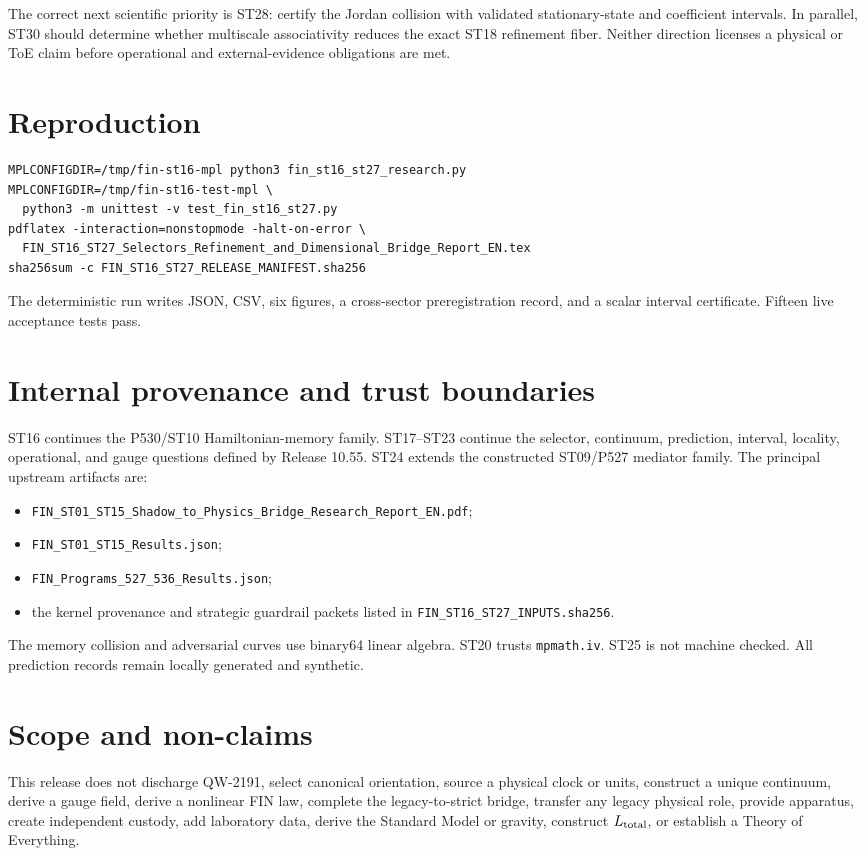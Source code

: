 \documentclass[11pt,a4paper]{article}
\begin{document}
The correct next scientific priority is ST28: certify the Jordan collision with validated stationary-state and coefficient intervals. In parallel, ST30 should determine whether multiscale associativity reduces the exact ST18 refinement fiber. Neither direction licenses a physical or ToE claim before operational and external-evidence obligations are met.

\appendix
\section{Reproduction}

\begin{verbatim}
MPLCONFIGDIR=/tmp/fin-st16-mpl python3 fin_st16_st27_research.py
MPLCONFIGDIR=/tmp/fin-st16-test-mpl \
  python3 -m unittest -v test_fin_st16_st27.py
pdflatex -interaction=nonstopmode -halt-on-error \
  FIN_ST16_ST27_Selectors_Refinement_and_Dimensional_Bridge_Report_EN.tex
sha256sum -c FIN_ST16_ST27_RELEASE_MANIFEST.sha256
\end{verbatim}

The deterministic run writes JSON, CSV, six figures, a cross-sector preregistration record, and a scalar interval certificate. Fifteen live acceptance tests pass.

\section{Internal provenance and trust boundaries}

ST16 continues the P530/ST10 Hamiltonian-memory family. ST17--ST23 continue the selector, continuum, prediction, interval, locality, operational, and gauge questions defined by Release 10.55. ST24 extends the constructed ST09/P527 mediator family. The principal upstream artifacts are:
\begin{itemize}
\item \texttt{FIN\_ST01\_ST15\_Shadow\_to\_Physics\_Bridge\_Research\_Report\_EN.pdf};
\item \texttt{FIN\_ST01\_ST15\_Results.json};
\item \texttt{FIN\_Programs\_527\_536\_Results.json};
\item the kernel provenance and strategic guardrail packets listed in \texttt{FIN\_ST16\_ST27\_INPUTS.sha256}.
\end{itemize}

The memory collision and adversarial curves use binary64 linear algebra. ST20 trusts \texttt{mpmath.iv}. ST25 is not machine checked. All prediction records remain locally generated and synthetic.

\section{Scope and non-claims}

This release does not discharge QW-2191, select canonical orientation, source a physical clock or units, construct a unique continuum, derive a gauge field, derive a nonlinear FIN law, complete the legacy-to-strict bridge, transfer any legacy physical role, provide apparatus, create independent custody, add laboratory data, derive the Standard Model or gravity, construct $L_{\rm total}$, or establish a Theory of Everything.
\end{document}
